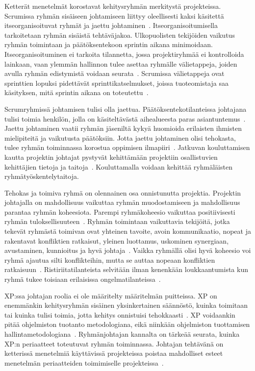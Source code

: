 \documentclass[finnish]{tktltiki2}
\theoremstyle{definition}
\theoremstyle{remark}
\begin{document}
Ketterät menetelmät korostavat kehitysryhmän merkitystä projekteissa. Scrumissa ryhmän sisäiseen johtamiseen liittyy oleellisesti kaksi käsitettä itseorganisoituvat ryhmät ja jaettu johtaminen~\cite{4755768}. Itseorganisoitumisella tarkoitetaan ryhmän sisäistä tehtäväjakoa. Ulkopuolisten tekijöiden vaikutus ryhmän toimintaan ja päätöksentekoon sprintin aikana minimoidaan. Itseorganisoituminen ei tarkoita tilannetta, jossa projektiryhmää ei kontrolloida lainkaan, vaan ylemmän hallinnon tulee asettaa ryhmälle välietappeja, joiden avulla ryhmän edistymistä voidaan seurata~\cite{Nerur:2005:CMA:1060710.1060712}. Scrumissa välietappeja ovat sprinttien lopuksi pidettävät sprinttikatselmukset, joissa tuoteomistaja saa käsityksen, mitä sprintin aikana on toteutettu~\cite{schwaber1995scrum}.

Scrumryhmissä johtamisen tulisi olla jaettua. Päätöksentekotilanteissa johtajana tulisi toimia henkilön, jolla on käsiteltävästä aihealueesta paras asiantuntemus~\cite{4755768}. Jaettu johtaminen vaatii ryhmän jäseniltä kykyä huomioida erilaisten ihmisten mielipiteitä ja vaikutusta päätöksiin. Jotta jaettu johtaminen olisi tehokasta, tulee ryhmän toiminnassa korostua oppimisen ilmapiiri~\cite{4755768}. Jatkuvan kouluttamisen kautta projektin johtajat pystyvät kehittämään projektiin osallistuvien kehittäjien tietoja ja taitoja~\cite{dall2004project}. Kouluttamalla voidaan kehittää ryhmäläisten ryhmätyöskentelytaitoja.

Tehokas ja toimiva ryhmä on olennainen osa onnistunutta projektia. Projektin johtajalla on mahdollisuus vaikuttaa ryhmän muodostamiseen ja mahdollisuus parantaa ryhmän koheesiota. Parempi ryhmäkoheesio vaikuttaa positiivisesti ryhmän tuloksellisuuteen~\cite{bahli2005group, McLeod:2011:FAS:1978802.1978803}. Ryhmän toimintaan vaikuttavia tekijöitä, jotka tekevät ryhmästä toimivan ovat yhteinen tavoite, avoin kommunikaatio, nopeat ja rakentavat konfliktien ratkaisut, yleinen luottamus, uskominen synergiaan, avustaminen, kunnioitus ja hyvä johtaja~\cite{4017705}. Vaikka ryhmällä olisi hyvä koheesio voi ryhmä ajautua silti konflikteihin, mutta se auttaa nopeaan konfliktien ratkaisuun~\cite{bradley1997effect}. Ristiriitatilanteista selvitään ilman kenenkään loukkaantumista kun ryhmä tukee toisiaan erilaisissa ongelmatilanteissa~\cite{bradley1997effect}.

XP:ssa johtajan roolia ei ole määritelty määritelmän puitteissa. XP on enemmänkin kehitysryhmän sisäinen yksinkertainen säännöstö, kuinka toimitaan tai kuinka tulisi toimia, jotta kehitys onnistuisi tehokkaasti~\cite{Augustine:2005:APM:1101779.1101781}. XP voidaankin pitää ohjelmiston tuotanto metodologiana, eikä niinkään ohjelmiston tuottamisen hallintametodologiana~\cite{cohen2004introduction}. Ryhmänjohtajan kannalta on tärkeää seurata, kuinka XP:n periaatteet toteutuvat ryhmän toiminnassa. Johtajan tehtävänä on ketterissä menetelmiä käyttävissä projekteissa poistaa mahdolliset esteet menetelmän periaatteiden toimimiselle projekteissa~\cite{Augustine:2005:APM:1101779.1101781}.
\end{document}
